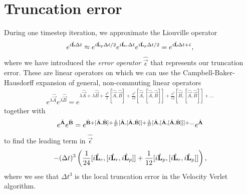 \section{Truncation error}
\label{sec:velocity_verlet_error}
During one timestep iteration, we approximate the Liouville operator
\begin{align}
	e^{i\hat{\mathbf L} \Delta t} \approx e^{i\hat{\mathbf L}_p \Delta t/2}e^{i\hat{\mathbf L}_r \Delta t}e^{i\hat{\mathbf L}_p \Delta t/2} = e^{i\hat{\mathbf L} \Delta t + \hat{\mathbf \epsilon}},
\end{align}
where we have introduced the \textit{error operator} $\hat{\vec \epsilon}$ that represents our truncation error. These are linear operators on which we can use the Campbell-Baker-Hausdorff expansion of general, non-commuting linear operators
\begin{align}
	e^{\lambda\hat{\vec A}}e^{\lambda\hat{\vec B}} = e^{\lambda\hat{\vec A} + \lambda\hat{\vec B} + \frac{\lambda^2}{2}[\hat{\vec A},\hat{\vec B}] + \frac{\lambda^3}{12}[\hat{\vec A},[\hat{\vec A},\hat{\vec B}]] + \frac{\lambda^3}{12}[\hat{\vec B},[\hat{\vec A},\hat{\vec B}]] + ...}
\end{align}
together with 
\begin{align}
	e^{\hat{\mathbf{A}}}e^{\hat{\mathbf{B}}} = e^{\hat{\mathbf{B}} + [\hat{\mathbf{A}},\hat{\mathbf{B}}] + \frac{1}{2!}[\hat{\mathbf{A}},[\hat{\mathbf{A}},\hat{\mathbf{B}}]] + \frac{1}{3!}[\hat{\mathbf{A}},[\hat{\mathbf{A}},[\hat{\mathbf{A}},\hat{\mathbf{B}}]]] + ...}e^{\hat{\mathbf{A}}}
\end{align}
to find the leading term in $\hat{\vec \epsilon}$
\begin{align}
	-(\Delta t)^3\left(\frac{1}{24}[i\hat{\mathbf L}_r, [i\hat{\mathbf L}_r, i\hat{\mathbf L}_p]] + \frac{1}{12}[i\hat{\mathbf L}_p, [i\hat{\mathbf L}_r, i\hat{\mathbf L}_p]]\right),
\end{align}
where we see that $\Delta t^3$ is the local truncation error in the Velocity Verlet algorithm. 
